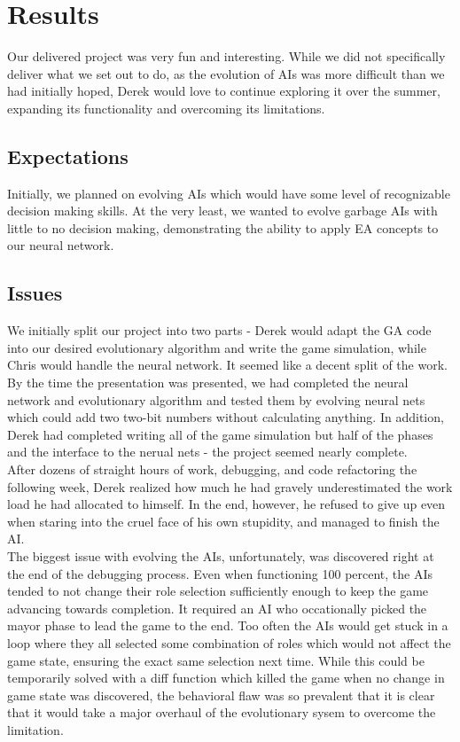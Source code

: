 
\section{Results}

Our delivered project was very fun and interesting.  While we did not specifically deliver what we set out to do, as the evolution of AIs was more difficult than we had initially hoped, Derek would love to continue exploring it over the summer, expanding its functionality and overcoming its limitations.


\subsection{Expectations}

Initially, we planned on evolving AIs which would have some level of recognizable decision making skills.  At the very least, we wanted to evolve garbage AIs with little to no decision making, demonstrating the ability to apply EA concepts to our neural network.

\subsection{Issues}

We initially split our project into two parts - Derek would adapt the GA code into our desired evolutionary algorithm and write the game simulation, while Chris would handle the neural network.  It seemed like a decent split of the work.  By the time the presentation was presented, we had completed the neural network and evolutionary algorithm and tested them by evolving neural nets which could add two two-bit numbers without calculating anything.  In addition, Derek had completed writing all of the game simulation but half of the phases and the interface to the nerual nets - the project seemed nearly complete. \\

After dozens of straight hours of work, debugging, and code refactoring the following week, Derek realized how much he had gravely underestimated the work load he had allocated to himself.  In the end, however, he refused to give up even when staring into the cruel face of his own stupidity, and managed to finish the AI.\\

The biggest issue with evolving the AIs, unfortunately, was discovered right at the end of the debugging process.  Even when functioning 100 percent, the AIs tended to not change their role selection sufficiently enough to keep the game advancing towards completion.  It required an AI who occationally picked the mayor phase to lead the game to the end.  Too often the AIs would get stuck in a loop where they all selected some combination of roles which would not affect the game state, ensuring the exact same selection next time.  While this could be temporarily solved with a diff function which killed the game when no change in game state was discovered, the behavioral flaw was so prevalent that it is clear that it would take a major overhaul of the evolutionary sysem to overcome the limitation.

